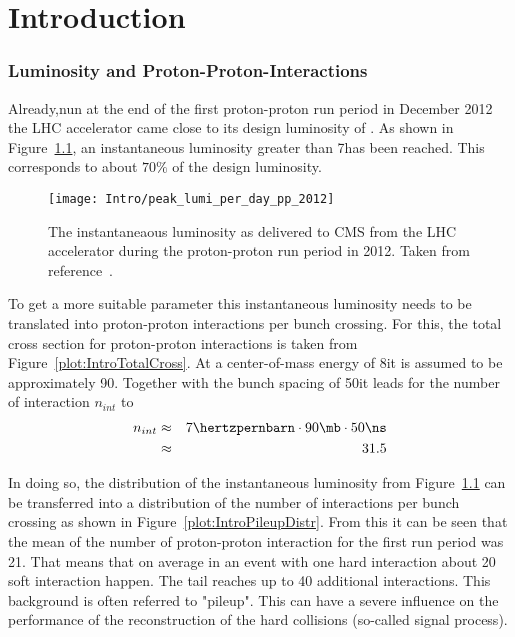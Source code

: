 \chapter{Introduction \label{sec:Intro}}

\subsection{Luminosity and Proton-Proton-Interactions \label{sec:IntroLumiPPI}}

Already,nun at the end of the first proton-proton run period in December 2012 the LHC accelerator came close to its design luminosity of \LHigh. As shown in Figure~\ref{plot:IntroInstLumi}, an instantaneous luminosity greater than 7\hertzpernbarn has been reached. This corresponds to about $70\%$ of the design luminosity.

\begin{figure}[!Hhtb]
  \centering
  \texttt{[image: Intro/peak\_lumi\_per\_day\_pp\_2012]}
  \caption[Instantaneous luminosity at CMS]{The instantaneaous luminosity as delivered to CMS from the LHC accelerator during the proton-proton run period in 2012. Taken from reference~. \label{plot:IntroInstLumi}}
\end{figure}

To get  a more suitable parameter this instantaneous luminosity needs to be translated into proton-proton interactions per bunch crossing. For this, the total cross section for proton-proton interactions is taken from Figure~\ref{plot:IntroTotalCross}. At a center-of-mass energy of 8\TeV it is assumed to be approximately 90\mb. Together with the bunch spacing of 50\ns it leads for the number of interaction $n_{int}$ to
\begin{eqnarray}
n_{int} & \approx & 7\hertzpernbarn \cdot 90\mb \cdot 50\ns \nonumber \\
 & \approx & 31.5 \nonumber
\end{eqnarray}

In doing so, the distribution of the instantaneous luminosity from Figure~\ref{plot:IntroInstLumi} can be transferred into a distribution of the number of interactions per bunch crossing as shown in Figure~\ref{plot:IntroPileupDistr}. From this it can be seen that the mean of the number of proton-proton interaction for the first run period was 21. That means that on average in an event with one hard interaction about 20 soft interaction happen. The tail reaches up to 40 additional interactions. This background is often referred to "pileup". This can have a severe influence on the performance of the reconstruction of the hard collisions (so-called signal process).

